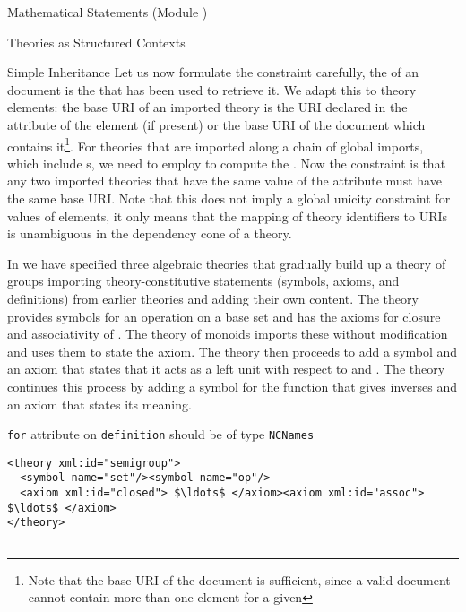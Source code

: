 \begin{tchapter}[id=statements,short=Mathematical Statements]{Mathematical Statements (Module {})}
\begin{tsection}[id=theories]{Theories as Structured Contexts}
\begin{tsubsection}[id=inheritance]{Simple Inheritance}
Let us now formulate the constraint carefully, the {} of an {\xml}
document is the {} that has been used to retrieve it.  We adapt this to
{\omdoc} theory elements: the base URI of an imported theory is the URI declared in the
{} attribute of the {} element (if present) or
the base URI of the document which contains it\footnote{Note that the base URI of the
  document is sufficient, since a valid {\omdoc} document cannot contain more than one
  {} element for a given {}}. For
theories that are imported along a chain of global imports, which include
{s}, we need to employ {} to compute
the {}.  Now the constraint is that any two imported theories that
have the same value of the {} attribute must have the
same base URI. Note that this does not imply a global unicity constraint for
{} values of {} elements, it only means
that the mapping of theory identifiers to URIs is unambiguous in the dependency cone of a
theory.

In {} we have specified three algebraic theories that gradually build
up a theory of groups importing theory-constitutive statements (symbols, axioms, and
definitions) from earlier theories and adding their own content. The theory
{} provides symbols for an operation {} on a base set
{} and has the axioms for closure and associativity of
{}. The theory of monoids imports these without modification and uses them
to state the {} axiom. The theory {} then proceeds to
add a symbol {} and an axiom that states that it acts as a left unit with
respect to {} and {}.  The theory {}
continues this process by adding a symbol {} for the function that gives
inverses and an axiom that states its meaning.

\begin{erratum}[reported-by=Michael Kohlhase,date=2009-08-11]{{\texttt{for}} attribute on
    {\texttt{definition}} should be of type {\texttt{NCNames}}}
\begin{lstlisting}[label=lst:def-group,escapechar=\%,mathescape,
  caption={A Structured Development of Algebraic Theories in {\omdoc}},
  index={theory,symbol,axiom,imports}]
<theory xml:id="semigroup">
  <symbol name="set"/><symbol name="op"/>
  <axiom xml:id="closed"> $\ldots$ </axiom><axiom xml:id="assoc"> $\ldots$ </axiom>
</theory>


\end{lstlisting}
\end{erratum}
\end{tsubsection}
\end{tsection}
\end{tchapter}
